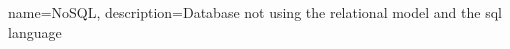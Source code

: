 {
	name=NoSQL,
	description={Database not using the relational model and the \acrshort{sql} language}
}


